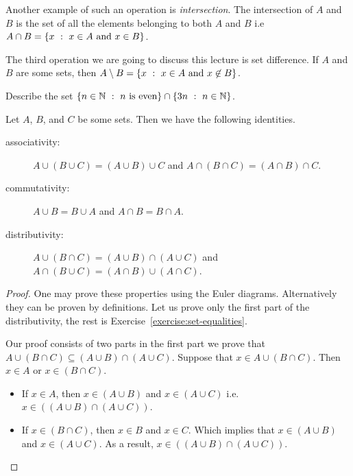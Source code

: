Another example of such an operation is \textit{intersection}. The
intersection of $A$ and $B$ is the set of all the elements belonging to both
$A$ and $B$ i.e $A \cap B = \set[x \in A \text{ and } x \in B]{x}$.

The third operation we are going to discuss this lecture is set difference.
If $A$ and $B$ are some sets, then
$A \setminus B = \set[x \in A \text{ and } x \not\in B]{x}$.

\begin{exercise}
  Describe the set
  $\set[n \text{ is even}]{n \in \N} \cap \set[n \in \N]{3n}$.
\end{exercise}

\begin{theorem}
\label{theorem:set-equalities}
  Let $A$, $B$, and $C$ be some sets. Then we have the following identities.
  \begin{description}
    \item[associativity:] $A \cup (B \cup C) = (A \cup B) \cup C$ and
      $A \cap (B \cap C) = (A \cap B) \cap C$.
    \item[commutativity:] $A \cup B = B \cup A$ and $A \cap B = B \cap A$.
    \item[distributivity:] $A \cup (B \cap C) = (A \cup B) \cap (A \cup C)$
      and $A \cap (B \cup C) = (A \cap B) \cup (A \cap C)$.
  \end{description}
\end{theorem}
\begin{proof}
  One may prove these properties using the Euler diagrams. Alternatively they
  can be proven by definitions. Let us prove only the first part of the
  distributivity, the rest is Exercise~\ref{exercise:set-equalities}.

  Our proof consists of two parts in the first part we prove that
  $A \cup (B \cap C) \subseteq (A \cup B) \cap (A \cup C)$.
  Suppose that $x \in A \cup (B \cap C)$. Then $x \in A$ or $x \in (B \cap C)$.
  \begin{itemize}
    \item If $x \in A$, then $x \in (A \cup B)$ and $x \in (A \cup C)$ i.e.
      $x \in ((A \cup B) \cap (A \cup C))$.
    \item If $x \in (B \cap C)$, then $x \in B$ and $x \in C$. Which implies
      that $x \in (A \cup B)$ and $x \in (A \cup C)$. As a result,
      $x \in ((A \cup B) \cap (A \cup C))$.
  \end{itemize}
\end{proof}

